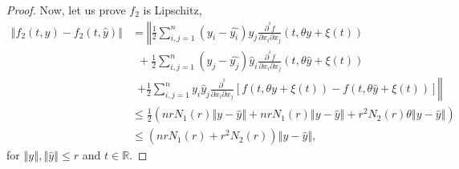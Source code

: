 \documentclass[english,reqno]{amsart}
\numberwithin{equation}{section}
\theoremstyle{plain}
\theoremstyle{definition}
\theoremstyle{remark}
\begin{document}
\begin{proof}
Now, let us prove $f_{2}$ is Lipschitz,
\begin{align}
\left\Vert f_{2}\left(t,y\right)-f_{2}\left(t,\hat{y}\right)\right\Vert  & =\left\Vert \frac{1}{2}\sum_{i,j=1}^{n}\left(y_{i}-\hat{y_{i}}\right)y_{j}\frac{\partial^{^{2}}f}{\partial x_{i}\partial x_{j}}\left(t,\theta y+\xi\left(t\right)\right)\right.\nonumber \\
 & \,\,\,+\frac{1}{2}\sum_{i,j=1}^{n}\left(y_{j}-\hat{y_{j}}\right)\hat{y}_{i}\frac{\partial^{^{2}}f}{\partial x_{i}\partial x_{j}}\left(t,\theta\hat{y}+\xi\left(t\right)\right)\nonumber \\
 & \,\,\,\left.+\frac{1}{2}\sum_{i,j=1}^{n}y_{i}\hat{y}_{j}\frac{\partial^{^{2}}}{\partial x_{i}\partial x_{j}}\left[f\left(t,\theta y+\xi\left(t\right)\right)-f\left(t,\theta\hat{y}+\xi\left(t\right)\right)\right]\right\Vert \nonumber \\
 & \leq\frac{1}{2}\left(nrN_{1}\left(r\right)\left\Vert y-\hat{y}\right\Vert +nrN_{1}\left(r\right)\left\Vert y-\hat{y}\right\Vert +r^{2}N_{2}\left(r\right)\theta\left\Vert y-\hat{y}\right\Vert \right)\nonumber \\
 & \leq\left(nrN_{1}\left(r\right)+r^{2}N_{2}\left(r\right)\right)\left\Vert y-\hat{y}\right\Vert ,\label{eq:lipschitzf_2}
\end{align}
for $\left\Vert y\right\Vert ,\left\Vert \hat{y}\right\Vert \leq r$ and $t\in\mathbb{R}$.


\end{proof}
\end{document}
